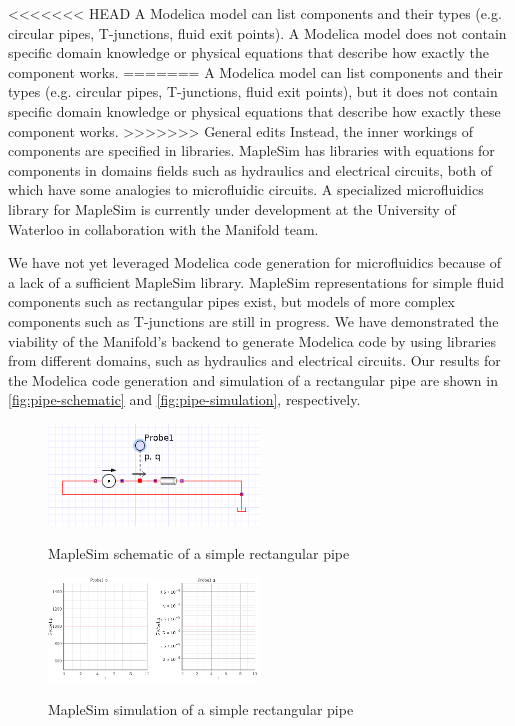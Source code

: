 <<<<<<< HEAD
A Modelica model can list components and their types (e.g. circular pipes, T-junctions, fluid exit points).
A Modelica model does not contain specific domain knowledge or physical equations that describe how exactly the component works.
=======
A Modelica model can list components and their types (e.g. circular pipes, T-junctions, fluid exit points),
but it does not contain specific domain knowledge or physical equations that describe how exactly these
component works.
>>>>>>> General edits
Instead, the inner workings of components are specified in libraries.
MapleSim has libraries with equations for components in domains fields such as hydraulics and electrical
circuits, both of which have some analogies to microfluidic circuits.
A specialized microfluidics library for MapleSim is currently under development at the University of Waterloo
in collaboration with the Manifold team.

We have not yet leveraged Modelica code generation for microfluidics because of a lack of a sufficient
MapleSim library.
MapleSim representations for simple fluid components such as rectangular pipes exist, but models of more complex components such as T-junctions are still in progress.
We have demonstrated the viability of the Manifold's backend to generate Modelica code by using
libraries from different domains, such as hydraulics and electrical circuits. Our results for the Modelica
code generation and simulation of a rectangular pipe are shown in \autoref{fig:pipe-schematic} and
\autoref{fig:pipe-simulation}, respectively.

\begin{figure}[!ht]
  \caption{MapleSim schematic of a simple rectangular pipe}
  \centering
    \includegraphics[width=0.5\textwidth]{img/simple-pipe.png}
	\label{fig:pipe-schematic}
\end{figure}
\begin{figure}[!ht]
  \caption{MapleSim simulation of a simple rectangular pipe}
  \centering
    \includegraphics[width=0.5\textwidth]{img/simple-pipe-simulation.png}
	\label{fig:pipe-simulation}
\end{figure}

